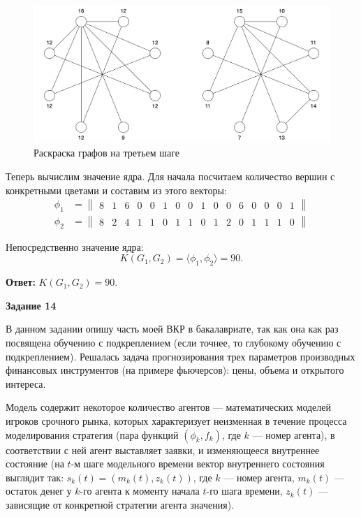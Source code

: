 \documentclass[12pt, a4paper]{extarticle}
\newenvironment*{dummyenv}{}{}
\newcommand{\mysection}[1]{
    \addcontentsline{toc}{section}{#1}
    \begin{dummyenv}
        \bfseries\large #1
    \end{dummyenv}
}
\newcommand{\Answer}[1]{\textbf{Ответ:} #1 \\}
\begin{document}
\begin{figure}[h!]
    \centering
    \includegraphics[width=\textwidth]{task13-3.png}
    \caption{Раскраска графов на третьем шаге}
    \label{fig:13-3}
\end{figure}

Теперь вычислим значение ядра. Для начала посчитаем количество вершин с конкретными цветами и составим
из этого векторы:
\begin{equation}
\begin{split}
    \phi_1 & = \begin{Vmatrix} 8 & 1 & 6 & 0 & 0 & 1 & 0 & 0 & 1 & 0 & 0 & 6 & 0 & 0 & 0 & 1 \end{Vmatrix} \\
    \phi_2 & = \begin{Vmatrix} 8 & 2 & 4 & 1 & 1 & 0 & 1 & 1 & 0 & 1 & 2 & 0 & 1 & 1 & 1 & 0 \end{Vmatrix}
\end{split}
\end{equation}

Непосредственно значение ядра:
\begin{equation}
    K(G_1, G_2) = \langle \phi_1, \phi_2 \rangle = 90.
\end{equation}

\Answer{$K(G_1, G_2) = 90$.}

\mysection{Задание 14}

В данном задании опишу часть моей ВКР в бакалавриате, так как она как раз посвящена обучению с подкреплением
(если точнее, то глубокому обучению с подкреплением). Решалась задача прогнозирования трех параметров 
производных финансовых инструментов (на примере фьючерсов): цены, объема и открытого интереса.

Модель содержит некоторое количество агентов --- математических моделей игроков срочного рынка, которых
характеризует неизменная в течение процесса моделирования стратегия (пара функций $(\phi_k, f_k)$, где
$k$ --- номер агента), в соответствии с ней агент выставляет заявки, и изменяющееся внутреннее состояние 
(на $t$-м шаге модельного времени вектор внутреннего состояния выглядит так: $s_k(t) = (m_k(t), z_k(t))$,
где $k$ --- номер агента, $m_k(t)$ --- остаток денег у $k$-го агента к моменту начала $t$-го шага времени,
$z_k(t)$ --- зависящие от конкретной стратегии агента значения). 
\end{document}
